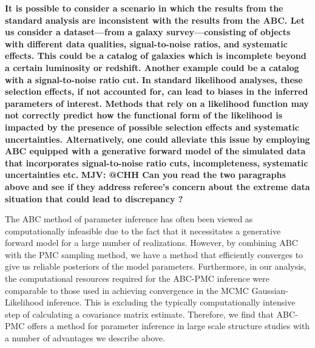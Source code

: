 \documentclass[fleqn,usenatbib]{mnras}
\begin{document}
{\bf \color{dred} It is possible to consider a scenario in which the results from the standard analysis are inconsistent with the results from the ABC. Let us consider a dataset---from a galaxy survey---consisting of objects with different data qualities, signal-to-noise ratios, and systematic effects. This could be a catalog of galaxies which is incomplete beyond a certain luminosity or redshift. Another example could be a catalog with a signal-to-noise ratio cut.}  {\bf \color{dred} In standard likelihood analyses, these selection effects, if not accounted for, can lead to biases in the inferred parameters of interest. Methods that rely on a likelihood function may not correctly predict how the functional form of the likelihood is impacted by the presence of possible selection effects and systematic uncertainties.  
Alternatively, one could alleviate this issue by employing ABC equipped with a generative forward model of the simulated data that incorporates signal-to-noise ratio cuts, incompleteness, systematic uncertainties etc. }{
\bf \color{darkgreen} MJV: @CHH Can you read the two paragraphs above and see if they address referee's concern about the extreme data situation that could lead to discrepancy ? }


The ABC method of parameter inference has often been viewed as computationally infeasible due to the 
fact that it necessitates a generative forward model for a large number of realizations. However, 
by combining ABC with the PMC sampling method,
we have a method that efficiently converges 
to give us reliable posteriors of the model parameters. Furthermore, in our analysis, the computational resources 
required for the ABC-PMC inference were comparable to those used in achieving convergence in the 
MCMC Gaussian-Likelihood inference. This is excluding the typically computationally intensive step of 
calculating a covariance matrix estimate. Therefore, we find that ABC-PMC offers a method for parameter
inference in large scale structure studies with a number of advantages we describe above. 
\end{document}
